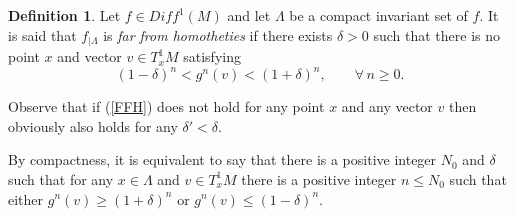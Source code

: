 \documentclass[a4paper,11pt]{article}
\newtheorem{remark}[lemma]{Remark}
\theoremstyle{definition}
\newtheorem{definition}[lemma]{Definition}
\def\La{\Lambda}
\def\de{\delta}
\def\La{\Lambda}
\begin{document}



\begin{definition}\label{def:FFH} Let $f\in Diff^1(M)$ and let $\La$ be a
compact invariant set of $f$. It is said that $f_{|\La}$ is {\it far from
homotheties} if there exists $\de>0$ such that there is no point $x$ and
vector $v\in T^1_xM$ satisfying
\begin{equation}\label{FFH}
(1-\de)^n< g^n(v)<(1+\de)^n, \qquad \forall\, n\geq 0.
\end{equation}
\end{definition}



Observe that if (\ref{FFH}) does not hold for any point $x$ and any vector $v$ then obviously also holds for any $\de'<\de$.

By compactness, it is equivalent to say that  there is a positive integer $N_0$ and $\de$ such that for any $x\in \La$ and $v\in T^1_xM$ there is a positive integer $n\leq N_0$ such that either $g^{n}(v)\geq (1+\de)^n$ or $g^{n}(v)\leq (1-\de)^n.$

\end{document}

